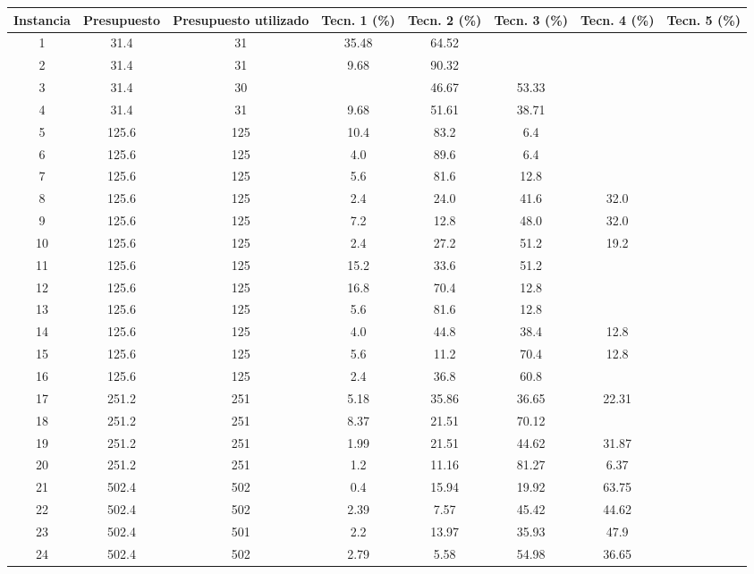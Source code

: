 \begin{table}
  \centering
  \small
  \begin{tabular}{cccccccc}
      \toprule
      Instancia & Presupuesto & Presupuesto utilizado & Tecn. 1 (\%) & Tecn. 2 (\%) & Tecn. 3 (\%) & Tecn. 4 (\%) & Tecn. 5 (\%) \\
      \midrule
      1 & 31.4 & 31 & 35.48 & 64.52 &  &  &  \\
      2 & 31.4 & 31 & 9.68 & 90.32 &  &  &  \\
      3 & 31.4 & 30 &  & 46.67 & 53.33 &  &  \\
      4 & 31.4 & 31 & 9.68 & 51.61 & 38.71 &  &  \\
      5 & 125.6 & 125 & 10.4 & 83.2 & 6.4 &  &  \\
      6 & 125.6 & 125 & 4.0 & 89.6 & 6.4 &  &  \\
      7 & 125.6 & 125 & 5.6 & 81.6 & 12.8 &  &  \\
      8 & 125.6 & 125 & 2.4 & 24.0 & 41.6 & 32.0 &  \\
      9 & 125.6 & 125 & 7.2 & 12.8 & 48.0 & 32.0 &  \\
      10 & 125.6 & 125 & 2.4 & 27.2 & 51.2 & 19.2 &  \\
      11 & 125.6 & 125 & 15.2 & 33.6 & 51.2 &  &  \\
      12 & 125.6 & 125 & 16.8 & 70.4 & 12.8 &  &  \\
      13 & 125.6 & 125 & 5.6 & 81.6 & 12.8 &  &  \\
      14 & 125.6 & 125 & 4.0 & 44.8 & 38.4 & 12.8 &  \\
      15 & 125.6 & 125 & 5.6 & 11.2 & 70.4 & 12.8 &  \\
      16 & 125.6 & 125 & 2.4 & 36.8 & 60.8 &  &  \\
      17 & 251.2 & 251 & 5.18 & 35.86 & 36.65 & 22.31 &  \\
      18 & 251.2 & 251 & 8.37 & 21.51 & 70.12 &  &  \\
      19 & 251.2 & 251 & 1.99 & 21.51 & 44.62 & 31.87 &  \\
      20 & 251.2 & 251 & 1.2 & 11.16 & 81.27 & 6.37 &  \\
      21 & 502.4 & 502 & 0.4 & 15.94 & 19.92 & 63.75 &  \\
      22 & 502.4 & 502 & 2.39 & 7.57 & 45.42 & 44.62 &  \\
      23 & 502.4 & 501 & 2.2 & 13.97 & 35.93 & 47.9 &  \\
      24 & 502.4 & 502 & 2.79 & 5.58 & 54.98 & 36.65 &  \\

\end{tabular}
\end{table}
